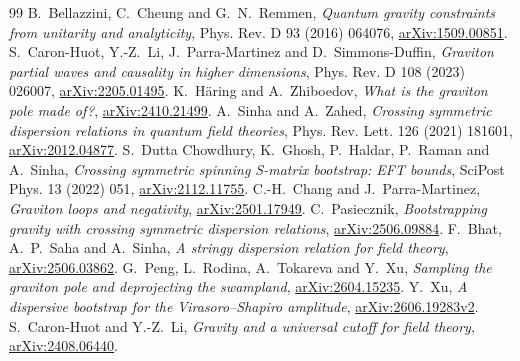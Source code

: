 \begin{thebibliography}{99}
B.~Bellazzini, C.~Cheung and G.~N.~Remmen,
\emph{Quantum gravity constraints from unitarity and analyticity},
Phys. Rev. D 93 (2016) 064076,
\href{https://arxiv.org/abs/1509.00851}{arXiv:1509.00851}.
S.~Caron-Huot, Y.-Z.~Li, J.~Parra-Martinez and D.~Simmons-Duffin,
\emph{Graviton partial waves and causality in higher dimensions},
Phys. Rev. D 108 (2023) 026007,
\href{https://arxiv.org/abs/2205.01495}{arXiv:2205.01495}.
K.~H\"aring and A.~Zhiboedov, \emph{What is the graviton pole made of?},
\href{https://arxiv.org/abs/2410.21499}{arXiv:2410.21499}.
A.~Sinha and A.~Zahed,
\emph{Crossing symmetric dispersion relations in quantum field theories},
Phys. Rev. Lett. 126 (2021) 181601,
\href{https://arxiv.org/abs/2012.04877}{arXiv:2012.04877}.
S.~Dutta Chowdhury, K.~Ghosh, P.~Haldar, P.~Raman and A.~Sinha,
\emph{Crossing symmetric spinning S-matrix bootstrap: EFT bounds},
SciPost Phys. 13 (2022) 051,
\href{https://arxiv.org/abs/2112.11755}{arXiv:2112.11755}.
C.-H.~Chang and J.~Parra-Martinez, \emph{Graviton loops and negativity},
\href{https://arxiv.org/abs/2501.17949}{arXiv:2501.17949}.
C.~Pasiecznik, \emph{Bootstrapping gravity with crossing symmetric dispersion relations}, 
\href{https://arxiv.org/abs/2506.09884}{arXiv:2506.09884}.
F.~Bhat, A.~P.~Saha and A.~Sinha, \emph{A stringy dispersion relation for field theory},
\href{https://arxiv.org/abs/2506.03862}{arXiv:2506.03862}.
G.~Peng, L.~Rodina, A.~Tokareva and Y.~Xu,
\emph{Sampling the graviton pole and deprojecting the swampland},
\href{https://arxiv.org/abs/2604.15235}{arXiv:2604.15235}.
Y.~Xu, \emph{A dispersive bootstrap for the Virasoro--Shapiro amplitude},
\href{https://arxiv.org/abs/2606.19283}{arXiv:2606.19283v2}.
S.~Caron-Huot and Y.-Z.~Li, \emph{Gravity and a universal cutoff for field theory},
\href{https://arxiv.org/abs/2408.06440}{arXiv:2408.06440}.
\end{thebibliography}

